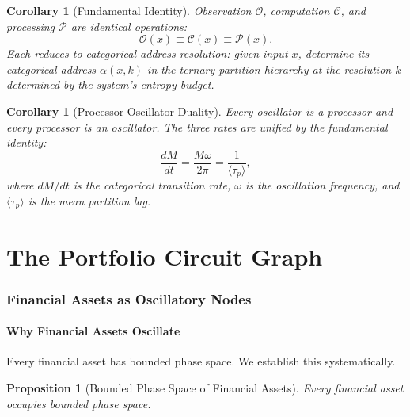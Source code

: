 \documentclass[twocolumn,10pt]{article}
\newtheorem{corollary}[theorem]{Corollary}
\newtheorem{proposition}[theorem]{Proposition}
\theoremstyle{remark}
\begin{document}
\begin{corollary}[Fundamental Identity]
\label{cor:fundamental_identity}
Observation $\mathcal{O}$, computation $\mathcal{C}$, and processing $\mathcal{P}$ are identical operations:
\begin{equation}
    \mathcal{O}(x) \equiv \mathcal{C}(x) \equiv \mathcal{P}(x).
    \label{eq:fundamental_identity}
\end{equation}
Each reduces to categorical address resolution: given input $x$, determine its categorical address $\alpha(x, k)$ in the ternary partition hierarchy at the resolution $k$ determined by the system's entropy budget.
\end{corollary}

\begin{corollary}[Processor-Oscillator Duality]
\label{cor:proc_osc}
Every oscillator is a processor and every processor is an oscillator.  The three rates are unified by the fundamental identity:
\begin{equation}
    \frac{dM}{dt} = \frac{M\omega}{2\pi} = \frac{1}{\langle \tau_p \rangle},
    \label{eq:fundamental_rate}
\end{equation}
where $dM/dt$ is the categorical transition rate, $\omega$ is the oscillation frequency, and $\langle \tau_p \rangle$ is the mean partition lag.
\end{corollary}


\part{The Portfolio Circuit Graph}

\section{Financial Assets as Oscillatory Nodes}
\label{sec:portfolio_circuit}

\subsection{Why Financial Assets Oscillate}

Every financial asset has bounded phase space.  We establish this systematically.

\begin{proposition}[Bounded Phase Space of Financial Assets]
\label{prop:asset_bounded}
Every financial asset occupies bounded phase space.
\end{proposition}
\end{document}
